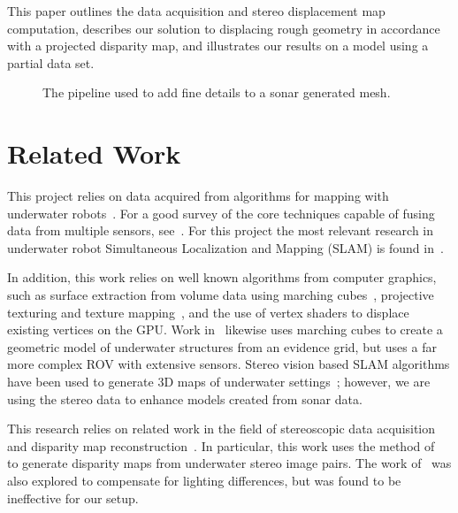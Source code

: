 \documentclass{llncs}
\begin{document}
This paper outlines the data acquisition and stereo displacement map computation, describes our solution to displacing rough geometry in accordance with a projected disparity map, and illustrates our results on a model using a partial  data set.
%
\begin{figure*}[!ht]
  \vspace{-0.2cm}
  \caption{The pipeline used to add fine details to a sonar generated mesh.}
 \label{fig:systemblock}
\end{figure*}
%
\vspace{-25pt}
\section{Related Work}
\label{sec:related_work}
\noindent This project relies on data acquired from algorithms for mapping with underwater robots~\cite{Williams09,opizarro-2009a,Fairfield2006,Clark2008b}. For a good survey of the core techniques capable of fusing data from multiple sensors, see~\cite{Thrun2005}.
For this project the most relevant  research in underwater robot Simultaneous Localization and Mapping (SLAM) is found in~\cite{Williams2000,harbor,Fairfield2005,Fairfield2006}.

In addition, this work relies on well known algorithms from computer graphics, such as surface extraction from volume data using marching cubes~\cite{Lorensen}, projective texturing and texture mapping~\cite{Williams78castingcurved,Segal}, and the use of vertex shaders to displace existing vertices on the GPU. Work in~\cite{Fairfield:2010} likewise uses marching cubes to create a geometric model of underwater structures from an evidence grid, but uses a far more complex ROV with extensive sensors.
Stereo vision based SLAM algorithms have been used to generate 3D maps of underwater settings~\cite{Mahon:2011,stereo:Roberson,stereo:Aqua}; however, we are using the stereo data to enhance models created from sonar data.

This research relies on related work in the field of stereoscopic data acquisition and disparity map reconstruction~\cite{stereo:scharsteinSzeliski}.
In particular, this work uses the method of~\cite{stereo:zitKan} to generate disparity maps from underwater stereo image pairs.
The work of~\cite{stereo:nalGast} was also explored to compensate for lighting differences, but was found to be ineffective for our setup. 
\vspace{-11pt}
\end{document}
